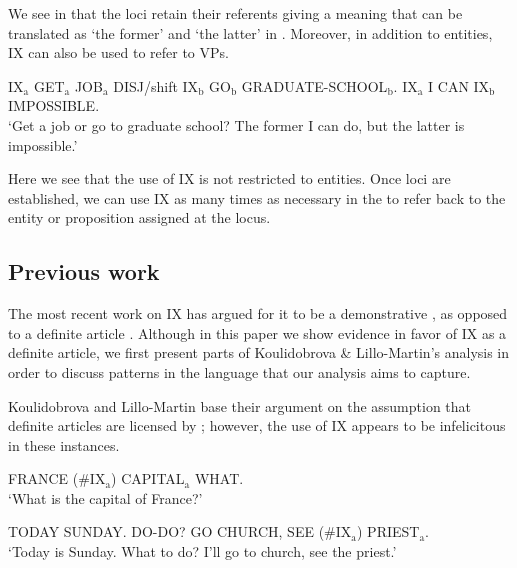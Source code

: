 \documentclass[output=paper,
modfonts
]{langscibook}
\begin{document}
We see in  that the loci retain their referents giving a meaning that can be translated as `the former' and `the latter' in . Moreover, in addition to entities, IX can also be used to refer to VPs.

\begin{exe} 
\setcounter{xnumi}{2}
\ex IX$_\text{a}$ GET$_\text{a}$ JOB$_\text{a}$ DISJ/shift IX$_\text{b}$ GO$_\text{b}$ GRADUATE-SCHOOL$_\text{b}$. IX$_\text{a}$ I CAN IX$_\text{b}$ IMPOSSIBLE.\\
`Get a job or go to graduate school? The former I can do, but the latter is impossible.’ \citep[5]{KoulidobrovaLilloMartin2016}
\end{exe}

Here we see that the use of IX is not restricted to entities. Once loci are established, we can use IX as many times as necessary in the  to refer back to the entity or proposition assigned at the locus.

\subsection{Previous work}

The most recent work on IX has argued for it to be a demonstrative \citep{KoulidobrovaLilloMartin2016}, as opposed to a definite article \citep{Bahanetal1995}. Although in this paper we show evidence in favor of IX as a definite article, we first present parts of Koulidobrova \& Lillo-Martin's analysis in order to discuss patterns in the language that our analysis aims to capture.

Koulidobrova and Lillo-Martin base their argument on the assumption that definite articles are licensed by ; however, the use of IX appears to be infelicitous in these instances.

\begin{exe}
\ex \label{ex:irani:4}FRANCE (\#IX$_\text{a}$) CAPITAL$_\text{a}$ WHAT. \\
`What is the capital of France?’ \citep[12]{KoulidobrovaLilloMartin2016}
\end{exe}

\begin{exe}                                                   
\ex \label{ex:irani:5} TODAY SUNDAY. DO-DO? GO CHURCH, SEE (\#IX$_\text{a}$) PRIEST$_\text{a}$.\\
`Today is Sunday. What to do? I’ll go to church, see the priest.' \\ \citep[12]{KoulidobrovaLilloMartin2016}
\end{exe}
\end{document}
